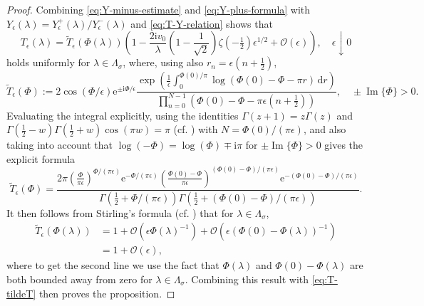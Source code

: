 \documentclass[12pt]{amsart}
\numberwithin{equation}{section}
\newcommand{\dd}{\mathrm{d}}
\newcommand{\ee}{\mathrm{e}}
\newcommand{\ii}{\mathrm{i}}
\newcommand{\SP}{\lambda}
\newcommand{\phaseint}{\Phi}
\newcommand{\rr}{r}
\newcommand{\bigo}[1]{ \mathcal{O}\! \left( #1 \right) }
\DeclareMathOperator{\imag}{Im}
\begin{document}
\begin{proof}
Combining \eqref{eq:Y-minus-estimate} and \eqref{eq:Y-plus-formula} with $Y_\epsilon(\SP)=Y_\epsilon^+(\SP)/Y_\epsilon^-(\SP)$ and \eqref{eq:T-Y-relation} shows that
\begin{equation}
T_\epsilon(\SP)=\widetilde{T}_\epsilon(\phaseint(\SP))
\left(1-\frac{2\ii v_0}{\SP}\left(1-\frac{1}{\sqrt{2}}\right)\zeta(-\tfrac{1}{2})\epsilon^{1/2}+\bigo{\epsilon}\right),
\quad\epsilon\downarrow 0
\label{eq:T-tildeT}
\end{equation}
holds uniformly for $\SP\in\Lambda_\sigma$, where, using also $\rr_n=\epsilon(n+\tfrac{1}{2})$,
\begin{equation}
\widetilde{T}_\epsilon(\phaseint):=2\cos(\phaseint/\epsilon)\ee^{\pm \ii\phaseint/\epsilon}\frac{\displaystyle
\exp\left(\frac{1}{\epsilon}\int_0^{\phaseint(0)/\pi}\log(\phaseint(0)-\phaseint-\pi \rr)\,\dd \rr\right)}{\displaystyle \prod_{n=0}^{N-1}(\phaseint(0)-\phaseint-\pi \epsilon(n+\tfrac{1}{2}))}, \quad \pm\imag\{\phaseint\}>0.
\end{equation}
Evaluating the integral explicitly, using the identities $\Gamma(z+1)=z\Gamma(z)$ and $\Gamma(\tfrac{1}{2}-w)\Gamma(\tfrac{1}{2}+w)\cos(\pi w)=\pi$ (cf. \cite[Eq.~5.5.3]{DLMF}) with $N=\phaseint(0)/(\pi\epsilon)$, and also taking into account that $\log(-\phaseint)=\log(\phaseint)\mp \ii\pi$ for $\pm\imag\{\phaseint\}>0$ gives the explicit formula
\begin{equation}
\widetilde{T}_\epsilon(\phaseint)=\frac{\displaystyle 2\pi\left(\frac{\phaseint}{\pi\epsilon}\right)^{\phaseint/(\pi\epsilon)}\ee^{-\phaseint/(\pi\epsilon)}\left(\frac{\phaseint(0)-\phaseint}{\pi\epsilon}\right)^{(\phaseint(0)-\phaseint)/(\pi\epsilon)}\ee^{-(\phaseint(0)-\phaseint)/(\pi\epsilon)}}{\displaystyle\Gamma(\tfrac{1}{2}+\phaseint/(\pi\epsilon))\Gamma(\tfrac{1}{2}+(\phaseint(0)-\phaseint)/(\pi\epsilon))}.
\end{equation}
It then follows from Stirling's formula (cf. \cite[Eq.~5.11.3]{DLMF}) that for $\SP\in\Lambda_\sigma$,
\begin{equation}
\begin{split}
\widetilde{T}_\epsilon(\phaseint(\SP)) &= 1+\bigo{\epsilon\phaseint(\SP)^{-1}}+\bigo{\epsilon(\phaseint(0)-\phaseint(\SP))^{-1}} \\ &= 1+\bigo{\epsilon},
\end{split}
\end{equation}
where to get the second line we use the fact that 
$\phaseint(\SP)$ and $\phaseint(0)-\phaseint(\SP)$ are both bounded away from zero for $\SP\in\Lambda_\sigma$.
Combining this result with \eqref{eq:T-tildeT} then proves the proposition.
\end{proof}
\end{document}

